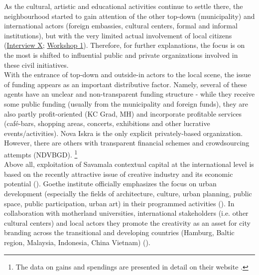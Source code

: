 \documentclass[11pt]{report}
\begin{document}
As the cultural, artistic and educational activities continue to settle there, the neighbourhood started to gain attention of the other top-down (municipality) and international actors (foreign embassies, cultural centers, formal and informal institutions), but with the very limited actual involvement of local citizens
(\href{InterviewX}{Interview X};
\href{Expert Workshop}{Workshop 1}).
Therefore, for further explanations, the focus is on the most is shifted to influential public and private organizations involved in these civil initiatives.
\\

With the entrance of top-down and outside-in actors to the local scene, the issue of funding appears as an important distributive factor.
Namely, several of these agents have an unclear and non-transparent funding structure - while they receive some public funding (usually from the municipality and foreign funds), they are also partly profit-oriented (KC Grad, MH) and incorporate profitable services (café-bars, shopping areas, concerts, exhibitions and other lucrative events/activities).
Nova Iskra is the only explicit privately-based organization.
However, there are others with transparent financial schemes and crowdsourcing attempts (NDVBGD).
\footnote{The data on gains and spendings are presented in detail on their website \cite{NDVBGD website}.}
\\

Above all, exploitation of Savamala contextual capital at the international level is based on the recently attractive issue of creative industry and its economic potential (\href{ref}{\citealt{landry_creative_2012}}).
Goethe institute officially emphasizes the focus on urban development (especially the fields of architecture, culture, urban planning, public space, public participation, urban art) in their programmed activities (\cite{Architecture-Goethe institute website}).
In collaboration with motherland universities, international stakeholders (i.e. other cultural centers) and local actors they promote the creativity as an asset for city branding across the transitional and developing countries (Hamburg, Baltic region, Malaysia, Indonesia, China Vietnam) (\href{ref}{\citealt{waibel_creativity_2014}}).
\\
\end{document}
